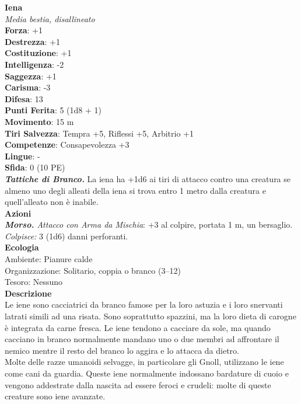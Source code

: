 \begin{multicols}{2}
\medskip\textbf{Iena}\\
\emph{Media bestia, disallineato}\\
\textbf{Forza}: +1\\
\textbf{Destrezza}: +1\\
\textbf{Costituzione}: +1\\
\textbf{Intelligenza}: -2\\
\textbf{Saggezza}: +1\\
\textbf{Carisma}: -3\\
\textbf{Difesa}: 13\\
\textbf{Punti Ferita}: 5 (1d8 + 1)\\
\textbf{Movimento}: 15 m\\
\textbf{Tiri Salvezza}: Tempra +5, Riflessi +5, Arbitrio +1 \\
\textbf{Competenze}: Consapevolezza +3\\
\textbf{Lingue}: -\\
\textbf{Sfida}: 0 (10 PE)\smallskip\\
\emph{\textbf{Tattiche di Branco.}} La iena ha +1d6 ai tiri di attacco contro una creatura se almeno uno degli alleati della iena si trova entro 1 metro dalla creatura e quell'alleato non è inabile.\\
\smallskip\textbf{Azioni}\\
\emph{\textbf{Morso.} Attacco con Arma da Mischia}: +3 al colpire, portata 1 m, un bersaglio.\\
\emph{Colpisce:} 3 (1d6) danni perforanti.\\
\textbf{Ecologia}\\
Ambiente: Pianure calde\\
Organizzazione: Solitario, coppia o branco (3–12)\\
Tesoro: Nessuno\\
\textbf{Descrizione}\\

Le iene sono cacciatrici da branco famose per la loro astuzia e i loro snervanti latrati simili ad una risata. Sono soprattutto spazzini, ma la loro dieta di carogne è integrata da carne fresca. Le iene tendono a cacciare da sole, ma quando cacciano in branco normalmente mandano uno o due membri ad affrontare il nemico mentre il resto del branco lo aggira e lo attacca da dietro.\\

Molte delle razze umanoidi selvagge, in particolare gli Gnoll, utilizzano le iene come cani da guardia. Queste iene normalmente indossano bardature di cuoio e vengono addestrate dalla nascita ad essere feroci e crudeli: molte di queste creature sono iene avanzate. \\



\end{multicols}
